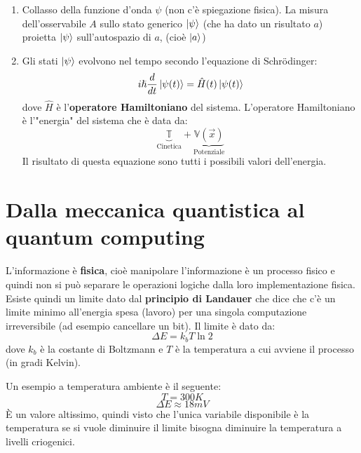 \documentclass[a4paper]{article}
\begin{document}
\begin{enumerate}
  \item Collasso della funzione d'onda \( \psi  \) (non c'è spiegazione fisica).
    La misura dell'osservabile \( A \) sullo stato generico \( \ket{\psi } \) (che ha dato
    un risultato \( a \)) proietta \( \ket{\psi } \) sull'autospazio di \( a \), (cioè \( \ket{a} \))

  \item Gli stati \( \ket{\psi } \) evolvono nel tempo secondo l'equazione di Schrödinger:
    \[
      i \hslash \frac{d}{dt} \ket{\psi(t) } = \hat{H}(t) \ket{\psi(t) }
    \] 
    dove \( \hat{H} \) è l'\textbf{operatore Hamiltoniano} del sistema.
    L'operatore Hamiltoniano è l'"energia" del sistema che è data da:
    \[
      \underbrace{\mathbb{T}}_{\text{Cinetica}} + \underbrace{\mathbb{V}(\vec{x})}_{\text{Potenziale}}
    \] 
    Il risultato di questa equazione sono tutti i possibili valori dell'energia.
\end{enumerate}

\section{Dalla meccanica quantistica al quantum computing}
L'informazione è \textbf{fisica}, cioè manipolare l'informazione è un processo fisico e
quindi non si può separare le operazioni logiche dalla loro implementazione fisica.
Esiste quindi un limite dato dal \textbf{principio di Landauer} che dice che c'è un limite
minimo all'energia spesa (lavoro) per una singola computazione irreversibile (ad esempio
cancellare un bit). Il limite è dato da:
\[
  \Delta E = k_bT \ln 2
\] 
dove \( k_b \) è la costante di Boltzmann e \( T \) è la temperatura a cui avviene il 
processo (in gradi Kelvin).

\begin{example}
  Un esempio a temperatura ambiente è il seguente:
  \[
    T = 300 K
  \] 
  \[
    \Delta E \approx 18 mV
  \] 
  È un valore altissimo, quindi visto che l'unica variabile disponibile è la temperatura
  se si vuole diminuire il limite bisogna diminuire la temperatura a livelli criogenici.
\end{example}
\end{document}
